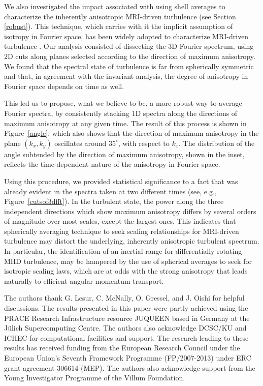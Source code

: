 \documentclass[]{emulateapj}
\begin{document}
We also investigated the impact associated with using shell averages
to characterize the inherently anisotropic MRI-driven turbulence (see Section \ref{robust}).
This technique, which carries with it the implicit assumption of isotropy in 
Fourier space, has been widely adopted to characterize MRI-driven turbulence
\citep{Hawley:1995gd,Workman:2008cf,2010A&A...514L...5F}.
Our analysis consisted of dissecting the 3D Fourier spectrum, using 2D cuts
along planes selected according to the direction of maximum anisotropy. 
We found that the spectral state of turbulence is far from spherically symmetric
and that, in agreement with the invariant analysis, the degree of anisotropy
in Fourier space depends on time as well. 

This led us to propose, 
what we believe to be, a more robust way to average Fourier spectra,
by consistently stacking 1D spectra along the directions of maximum 
anisotropy at any given time. The result of this process is shown in
Figure~\ref{angle}, which also shows that the direction of maximum 
anisotropy in the plane $({k_x,k_y})$ oscillates around $35^\circ$,
with respect to $k_x$. The distribution of the angle subtended by 
the direction of maximum anisotropy, shown in the inset, reflects
the time-dependent nature of the anisotropy in Fourier space.

Using this procedure, we provided statistical significance to a fact that
was already evident in the spectra taken at two different times
(see, e.g., Figure~\ref{cutsof3dfft}). In the turbulent state, the power
along the three independent directions which show maximum anisotropy 
differs by several orders of magnitude over most 
scales, except the largest ones.  This indicates that spherically averaging
technique to seek scaling relationships for MRI-driven turbulence may
distort the underlying, inherently anisotropic turbulent spectrum. In particular, 
the identification of an inertial range for differentially rotating MHD turbulence, 
may be hampered by the use of spherical averages to seek for isotropic scaling laws, 
which are at odds with the strong anisotropy that leads naturally to efficient 
angular momentum transport. 








  
\acknowledgments
The authors thank G. Lesur, C. McNally, O. Gressel, and J. Oishi for helpful discussions.
The results presented in this paper were partly achieved using the 
PRACE Research Infrastructure resource JUQUEEN based in Germany at 
the J\"ulich Supercomputing Centre. The authors also acknowledge DCSC/KU 
and ICHEC for computational facilities and support.
The research leading to these results has received funding from the 
European Research Council under the European Union's Seventh Framework 
Programme (FP/2007-2013) under ERC grant  agreement 306614 (MEP). 
The authors also acknowledge support from the Young Investigator 
Programme of the Villum Foundation. 



  
  
\end{document}
